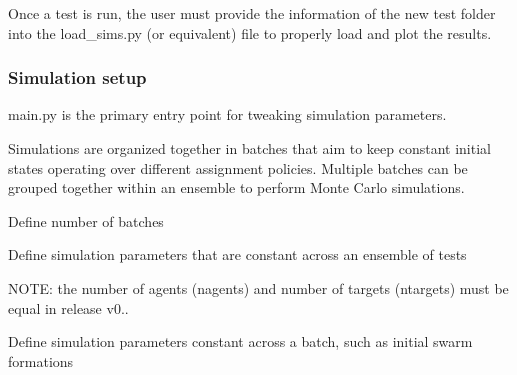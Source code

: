 Once a test is run, the user must provide the information of the new test folder into the load\+\_\+sims.\+py (or equivalent) file to properly load and plot the results.

\subsubsection*{Simulation setup}

main.\+py is the primary entry point for tweaking simulation parameters.

Simulations are organized together in batches that aim to keep constant initial states operating over different assignment policies. Multiple batches can be grouped together within an ensemble to perform Monte Carlo simulations.

Define number of batches 
\begin{DoxyCode}{0}
\end{DoxyCode}


Define simulation parameters that are constant across an ensemble of tests 
\begin{DoxyCode}{0}
\end{DoxyCode}
 N\+O\+TE\+: the number of agents (nagents) and number of targets (ntargets) must be equal in release v0..

Define simulation parameters constant across a batch, such as initial swarm formations 
\begin{DoxyCode}{0}
\DoxyCodeLine{        \}}
\end{DoxyCode}


